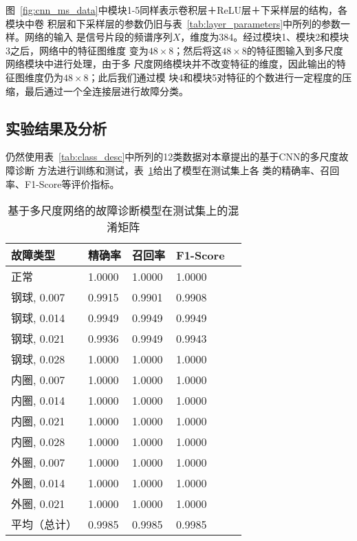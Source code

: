 图~\ref{fig:cnn_ms_data}中模块1-5同样表示卷积层＋ReLU层＋下采样层的结构，各模块中卷
积层和下采样层的参数仍旧与表~\ref{tab:layer_parameters}中所列的参数一样。网络的输入
是信号片段的频谱序列$X$，维度为384。经过模块1、模块2和模块3之后，网络中的特征图维度
变为$48\times 8$；然后将这$48\times 8$的特征图输入到多尺度网络模块中进行处理，由于多
尺度网络模块并不改变特征的维度，因此输出的特征图维度仍为$48\times 8$；此后我们通过模
块4和模块5对特征的个数进行一定程度的压缩，最后通过一个全连接层进行故障分类。

\subsection{实验结果及分析}

仍然使用表~\ref{tab:class_desc}中所列的12类数据对本章提出的基于CNN的多尺度故障诊断
方法进行训练和测试，表~\ref{tab:chap4:classification_report}给出了模型在测试集上各
类的精确率、召回率、F1-Score等评价指标。
\begin{table}[htb]
  \centering
  \begin{minipage}[t]{0.8\linewidth}
  \caption{基于多尺度网络的故障诊断模型在测试集上的混淆矩阵}
  \label{tab:chap4:classification_report}
    \begin{tabularx}{\linewidth}{XXXXX}
      \toprule[1.5pt]
        故障类型    & 精确率 & 召回率 & F1-Score \\
      \midrule[1pt]
        正常        & 1.0000 & 1.0000 & 1.0000 \\
        钢球, 0.007 & 0.9915 & 0.9901 & 0.9908 \\
        钢球, 0.014 & 0.9949 & 0.9949 & 0.9949 \\
        钢球, 0.021 & 0.9936 & 0.9949 & 0.9943 \\
        钢球, 0.028 & 1.0000 & 1.0000 & 1.0000 \\
        内圈, 0.007 & 1.0000 & 1.0000 & 1.0000 \\
        内圈, 0.014 & 1.0000 & 1.0000 & 1.0000 \\
        内圈, 0.021 & 1.0000 & 1.0000 & 1.0000 \\
        内圈, 0.028 & 1.0000 & 1.0000 & 1.0000 \\
        外圈, 0.007 & 1.0000 & 1.0000 & 1.0000 \\
        外圈, 0.014 & 1.0000 & 1.0000 & 1.0000 \\
        外圈, 0.021 & 1.0000 & 1.0000 & 1.0000 \\
      \midrule[1pt]
        平均（总计）& 0.9985 & 0.9985 & 0.9985 \\
      \bottomrule[1.5pt]
    \end{tabularx}
  \end{minipage}
\end{table}

